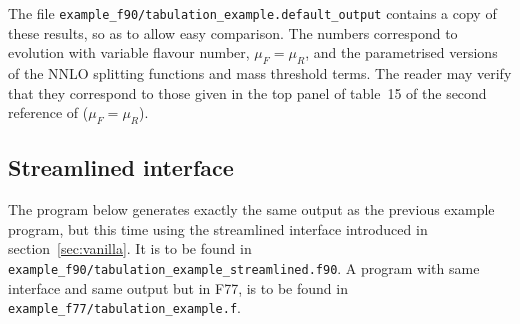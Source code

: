 \documentclass[12pt]{article}
\newcommand{\ttt}[1]{\texttt{#1}}
\begin{document}
\noindent The file
\ttt{example\_f90/tabulation\_example.default\_output} contains a copy
of these results, so as to allow easy comparison. The numbers
correspond to evolution with variable flavour number, $\mu_F = \mu_R$,
and the parametrised versions of the NNLO splitting functions and mass
threshold terms.
%
The reader may verify that they correspond to those given in the top
panel of table~15 of the second reference of \cite{Giele:2002hx,Dittmar:2005ed} ($\mu_F
= \mu_R$).

\subsection{Streamlined interface}
\label{sec:stream-example}

The program below generates exactly the same output
as the previous example program, but this time
using the streamlined interface introduced
in section~\ref{sec:vanilla}. It is to be
found in
\ttt{example\_f90/tabulation\_example\_streamlined.f90}. 
A program with same interface and same output 
but in F77, is to be found in
\ttt{example\_f77/tabulation\_example.f}.
\end{document}
